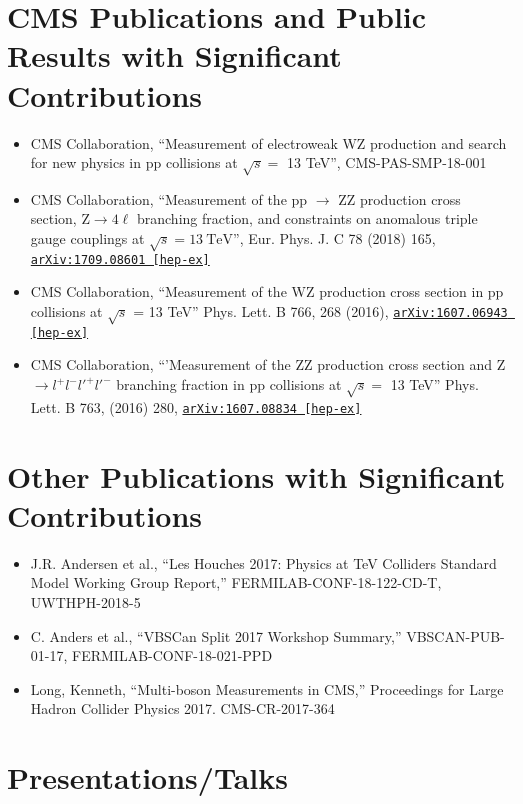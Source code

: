 \documentclass[10pt]{res} %
\begin{document}
\begin{resume}
\section{CMS Publications and Public Results with Significant Contributions}
\begin{itemize}
  \item CMS Collaboration, ``Measurement of electroweak WZ production and search for new physics in pp collisions at $\sqrt{s} =$ 13 TeV'', CMS-PAS-SMP-18-001
  \item CMS Collaboration, ``Measurement of the pp $\rightarrow$ ZZ production cross section, $\mathrm{Z} \to 4\ell$ branching fraction, and constraints on anomalous triple gauge couplings at $\sqrt{s} = 13~\mathrm{TeV}$'', Eur. Phys. J. C 78 (2018) 165, \href{https://arxiv.org/abs/1709.08601}{\texttt{arXiv:1709.08601 [hep-ex]}}
  \item CMS Collaboration, ``Measurement of the WZ production cross section in pp collisions at $\sqrt{s}$ = 13 TeV''
Phys. Lett. B 766, 268 (2016), \href{https://arxiv.org/abs/1607.06943}{\texttt{arXiv:1607.06943 [hep-ex]}}
  \item CMS Collaboration, ``'Measurement of the ZZ production cross section and Z $\rightarrow l^{+}l^{-}l'^{+}l'^{-}$ branching fraction in pp collisions at $\sqrt{s} =$ 13 TeV''
Phys. Lett. B 763, (2016) 280, \href{https://arxiv.org/abs/1607.08834} {\texttt{arXiv:1607.08834 [hep-ex]}}
\end{itemize}

\section{Other Publications with Significant Contributions}
\begin{itemize}
  \item J.R. Andersen et al., ``Les Houches 2017: Physics at TeV Colliders Standard Model Working Group Report,''
    FERMILAB-CONF-18-122-CD-T, UWTHPH-2018-5
  \item C. Anders et al., ``VBSCan Split 2017 Workshop Summary,'' 
    VBSCAN-PUB-01-17, FERMILAB-CONF-18-021-PPD
  \item Long, Kenneth, ``Multi-boson Measurements in CMS,''
    Proceedings for Large Hadron Collider Physics 2017. CMS-CR-2017-364
\end{itemize}

\section{Presentations/Talks}
\vspace{-0.1in}


\end{resume}
\end{document}
